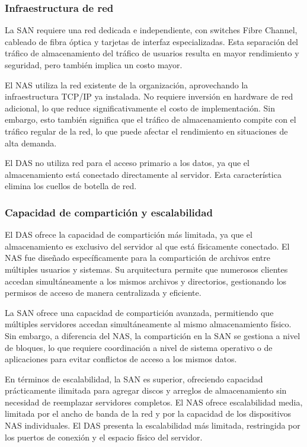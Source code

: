 \subsubsection{Infraestructura de red}

La SAN requiere una red dedicada e independiente, con switches Fibre Channel, cableado de fibra óptica y tarjetas de interfaz especializadas. Esta separación del tráfico de almacenamiento del tráfico de usuarios resulta en mayor rendimiento y seguridad, pero también implica un costo mayor.

El NAS utiliza la red existente de la organización, aprovechando la infraestructura TCP/IP ya instalada. No requiere inversión en hardware de red adicional, lo que reduce significativamente el costo de implementación. Sin embargo, esto también significa que el tráfico de almacenamiento compite con el tráfico regular de la red, lo que puede afectar el rendimiento en situaciones de alta demanda.

El DAS no utiliza red para el acceso primario a los datos, ya que el almacenamiento está conectado directamente al servidor. Esta característica elimina los cuellos de botella de red.

\subsubsection{Capacidad de compartición y escalabilidad}

El DAS ofrece la capacidad de compartición más limitada, ya que el almacenamiento es exclusivo del servidor al que está físicamente conectado. El NAS fue diseñado específicamente para la compartición de archivos entre múltiples usuarios y sistemas. Su arquitectura permite que numerosos clientes accedan simultáneamente a los mismos archivos y directorios, gestionando los permisos de acceso de manera centralizada y eficiente.

La SAN ofrece una capacidad de compartición avanzada, permitiendo que múltiples servidores accedan simultáneamente al mismo almacenamiento físico. Sin embargo, a diferencia del NAS, la compartición en la SAN se gestiona a nivel de bloques, lo que requiere coordinación a nivel de sistema operativo o de aplicaciones para evitar conflictos de acceso a los mismos datos.

En términos de escalabilidad, la SAN es superior, ofreciendo capacidad prácticamente ilimitada para agregar discos y arreglos de almacenamiento sin necesidad de reemplazar servidores completos. El NAS ofrece escalabilidad media, limitada por el ancho de banda de la red y por la capacidad de los dispositivos NAS individuales. El DAS presenta la escalabilidad más limitada, restringida por los puertos de conexión y el espacio físico del servidor.

